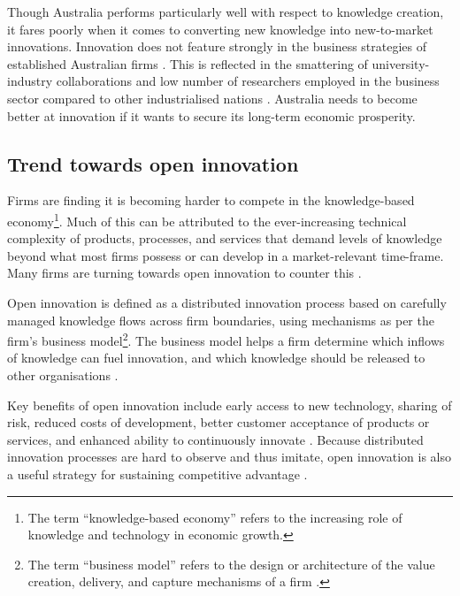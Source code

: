 Though Australia performs particularly well with respect to knowledge creation, it fares poorly when it comes to converting new knowledge into new-to-market innovations. Innovation does not feature strongly in the business strategies of established Australian firms \citep{dodgson2011systems,leung2016view}. This is reflected in the smattering of university-industry collaborations and low number of researchers employed in the business sector compared to other industrialised nations \citep{pettigrew2012australia}. Australia needs to become better at innovation if it wants to secure its long-term economic prosperity. \medskip

\subsection{Trend towards open innovation}

Firms are finding it is becoming harder to compete in the knowledge-based economy\footnote{The term \enquote{knowledge-based economy} refers to the increasing role of knowledge and technology in economic growth.}. Much of this can be attributed to the ever-increasing technical complexity of products, processes, and services that demand levels of knowledge beyond what most firms possess or can develop in a market-relevant time-frame. Many firms are turning towards open innovation to counter this \citep{enkel2009open,bessant2013innovation,stanko2017under}. \medskip

Open innovation is defined as a distributed innovation process based on carefully managed knowledge flows across firm boundaries, using mechanisms as per the firm's business model\footnote{The term \enquote{business model} refers to the design or architecture of the value creation, delivery, and capture mechanisms of a firm \citep{teece2010business}.}. The business model helps a firm determine which inflows of knowledge can fuel innovation, and which knowledge should be released to other organisations \citep{chesbrough2017future}. \medskip 

Key benefits of open innovation include early access to new technology, sharing of risk, reduced costs of development, better customer acceptance of products or services, and enhanced ability to continuously innovate \citep{ye2013exploring}. Because distributed innovation processes are hard to observe and thus imitate, open innovation is also a useful strategy for sustaining competitive advantage \citep{barney1991firm,lichtenthaler2011open}. \medskip

